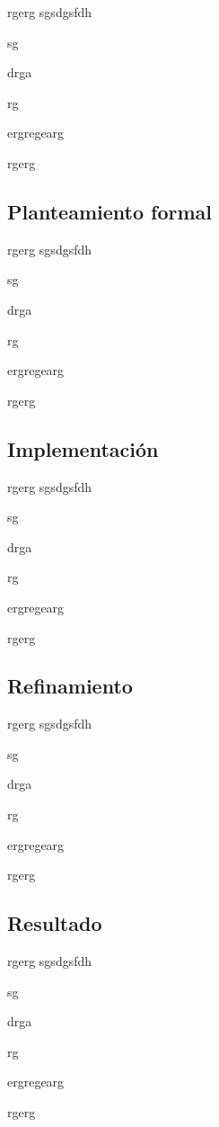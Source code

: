 rgerg
sgsdgsfdh

sg

drga

rg

ergregearg

rgerg

\subsection{Planteamiento formal}

rgerg
sgsdgsfdh

sg

drga

rg

ergregearg

rgerg

\subsection{Implementación}

rgerg
sgsdgsfdh

sg

drga

rg

ergregearg

rgerg

\subsection{Refinamiento}

rgerg
sgsdgsfdh

sg

drga

rg

ergregearg

rgerg

\subsection{Resultado}

rgerg
sgsdgsfdh

sg

drga

rg

ergregearg

rgerg
